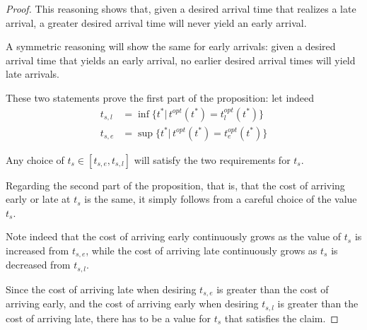 \begin{proof}
  This reasoning shows that, given a desired arrival time that realizes a late arrival,
  a greater desired arrival time will never yield an early arrival.

  A symmetric reasoning will show the same for early arrivals:
  given a desired arrival time that yields an early arrival,
  no earlier desired arrival times will yield late arrivals.

  These two statements prove the first part of the proposition:
  let indeed
  \begin{align*}
    t_{s, l} & = \inf\{t^* |\, t^{opt}(t^*) = t_l^{opt}(t^*)\} \\
    t_{s, e} & = \sup\{t^* |\, t^{opt}(t^*) = t_e^{opt}(t^*)\}
  \end{align*}

  Any choice of \(t_s \in [t_{s, e}, t_{s, l}]\) will satisfy the two requirements for \(t_s\).

  Regarding the second part of the proposition,
  that is, that the cost of arriving early or late at \(t_s\) is the same,
  it simply follows from a careful choice of the value \(t_s\).

  Note indeed that the cost of arriving early continuously grows as the value of \(t_s\) is increased from \(t_{s, e}\),
  while the cost of arriving late continuously grows as \(t_s\) is decreased from \(t_{s, l}\).

  Since the cost of arriving late when desiring \(t_{s, e}\) is greater than the cost of arriving early,
  and the cost of arriving early when desiring \(t_{s, l}\) is greater than the cost of arriving late,
  there has to be a value for \(t_s\) that satisfies the claim.
\end{proof}


